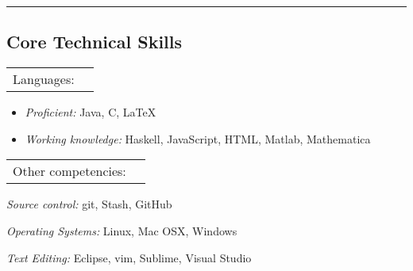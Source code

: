 \documentclass[10pt,letterpaper]{article}
\makeatletter
\newcommand{\headerrow}[2]
{\begin{tabular*}{\linewidth}{l@{\extracolsep{\fill}}r}
	#1 &
	#2 \\
\end{tabular*}}
\makeatother
\begin{document}
\hrule
\vspace{-0.4em}
\subsection*{Core Technical Skills}

\begin{description}
	\item
	\headerrow {Languages:}{}
	\begin{itemize}
		\item \textit{Proficient:} Java, C, \LaTeX
		\item \textit{Working knowledge:} Haskell, JavaScript, HTML, Matlab, Mathematica
	\end{itemize}
	
	\item
	\headerrow{Other competencies:}{}
	\begin{itemize*}
		\item \textit{Source control:} git, Stash, GitHub
		\item \textit{Operating Systems:} Linux, Mac OSX, Windows
		\item \textit{Text Editing:} Eclipse, vim, Sublime, Visual Studio
	\end{itemize*}
	
\end{description}
\end{document}
